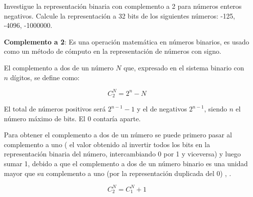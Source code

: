 \documentclass[11pt]{article}
\begin{document}
	
	
	
	
	
	
	
	
	
	
	
	
	
	
	
	
	
	\begin{problem}
		Investigue la representación binaria con complemento a 2 para
		números enteros negativos. Calcule la representación a 32 bits
		de los siguientes números: -125, -4096, -1000000.
	\end{problem}
	
	\textbf{Complemento a 2}: Es una operación matemática en números binarios, es usado como un método de cómputo en la representación de  números con signo\cite{Compleme27:online}.
	

	El complemento a dos de un número $N$ que, expresado en el sistema binario con $n$ dígitos, se define como:
	
	$${\displaystyle C_{2}^{N}=2^{n}-N}$$
	
	
	El total de números positivos será ${\displaystyle 2^{n-1}-1}$ y el de negativos ${\displaystyle 2^{n-1}}$, siendo $n$ el número máximo de bits. El 0 contaría aparte\cite{Compleme27:online}.
	
	 
	  Para obtener el complemento a dos de un número se puede primero pasar al complemento a uno ( el valor obtenido al invertir todos los bits en la representación binaria del número, intercambiando 0 por 1 y viceversa)  y luego sumar 1, debido a que el complemento a dos de un número binario es  	una unidad mayor que su complemento a uno (por la representación duplicada del 0) \cite{Compleme27:online}, \cite{Compleme58:online}.
	
	$${\displaystyle C_{2}^{N}=C_{1}^{N}+1}$$	
	
	
	
\end{document}
